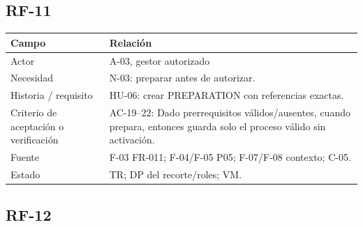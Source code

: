 \documentclass[12pt,a4paper]{report}
\begin{document}
\subsection{RF-11}\label{matriz-RF-11}

{\def\LTcaptype{none} %
\begin{longtable}[]{@{}
  >{\raggedright\arraybackslash}p{}
  >{\raggedright\arraybackslash}p{}@{}}
\toprule\noalign{}
\begin{minipage}[b]{\linewidth}\raggedright
Campo
\end{minipage} & \begin{minipage}[b]{\linewidth}\raggedright
Relación
\end{minipage} \\
\midrule\noalign{}
\endhead
\bottomrule\noalign{}
\endlastfoot
Actor & A-03, gestor autorizado \\
Necesidad & N-03: preparar antes de autorizar. \\
Historia / requisito & HU-06: crear PREPARATION con referencias
exactas. \\
Criterio de aceptación o verificación & AC-19--22: Dado
prerrequisitos válidos/ausentes, cuando prepara, entonces guarda solo el
proceso válido sin activación. \\
Fuente & F-03 FR-011; F-04/F-05 P05; F-07/F-08 contexto; C-05. \\
Estado & TR; DP del recorte/roles; VM. \\
\end{longtable}
}

\subsection{RF-12}\label{matriz-RF-12}
\end{document}
